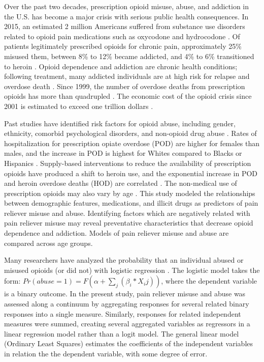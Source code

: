 \documentclass[sigconf]{acmart}
\begin{document}
Over the past two decades, prescription opioid misuse, abuse, and addiction 
in the U.S. has become a major crisis with serious public health consequences.
In 2015, an estimated 2 million Americans suffered from substance use disorders 
related to opioid pain medications such as oxycodone and hydrocodone 
\cite{nida18,cdc18}. Of patients legitimately prescribed opioids for chronic 
pain, approximately 25\% misused them, between 8\% to 12\% became addicted, and 
4\% to 6\% transitioned to heroin \cite{vowles15, carlson16}. Opioid dependence 
and addiction are chronic health conditions; following treatment, many addicted 
individuals are at high risk for relapse and overdose death \cite{shaham03}. 
Since 1999, the number of overdose deaths from prescription opioids has more 
than quadrupled \cite{cdc16}. The economic cost of the opioid crisis since 2001 
is estimated to exceed one trillion dollars \cite{altarum18}. 

Past studies have identified risk factors for opioid abuse, including gender, 
ethnicity, comorbid psychological disorders, and non-opioid drug abuse 
\cite{yokell13,rice12}. Rates of hospitalization for prescription opiate overdose 
(POD) are higher for females than males, and the increase in POD is highest for
Whites compared to Blacks or Hispanics \cite{unick13}. Supply-based interventions 
to reduce the availability of prescription opioids have produced a shift to 
heroin use, and the exponential increase in POD and heroin overdose deaths (HOD) 
are correlated \cite{jones15,reifler12}. The non-medical use of prescription 
opioids may also vary by age \cite{mccabe12}. This study modeled the 
relationships between demographic features, medications, and illicit drugs as 
predictors of pain reliever misuse and abuse. Identifying factors which 
are negatively related with pain reliever misuse may reveal preventative 
characteristics that decrease opioid dependence and addiction. Models of pain 
reliever misuse and abuse are compared across age groups. 


Many researchers have analyzed the probability that an individual abused 
or misused opioids (or did not) with logistic regression 
\cite{rice12, unick13, jones15, mccabe12}. The logistic model takes the form:
$ Pr(abuse=1) = F(\alpha+\sum_j(\beta_i*X_ij)) $, where the dependent variable
is a binary outcome. In the present study, pain reliever misuse and abuse was 
assessed along a continuum by aggregating responses for several related binary 
responses into a single measure. Similarly, responses for related independent 
measures were summed, creating several aggregated variables as regressors in a 
linear regression model rather than a logit model. The general linear model 
(Ordinary Least Squares) estimates the coefficients of the independent 
variables in relation the the dependent variable, with some degree of error. 
\end{document}
